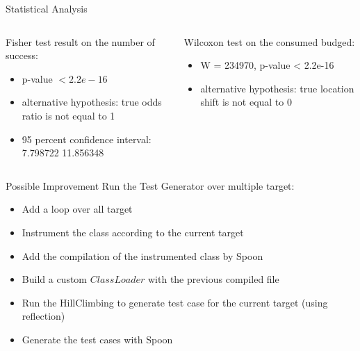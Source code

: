 \documentclass{beamer}
\begin{document}
\begin{frame}{Statistical Analysis}

\begin{columns}
\begin{column}{0.5\textwidth}
Fisher test result on the number of success:
\begin{mdframed}
\begin{itemize}
\item p-value $< 2.2e-16$
\item alternative hypothesis: true odds ratio is not equal to 1
\item 95 percent confidence interval: 7.798722 11.856348
\end{itemize}
\end{mdframed}
\end{column}
\begin{column}{0.5\textwidth}
Wilcoxon test on the consumed budged:
\begin{mdframed}
\begin{itemize}
\item W = 234970, p-value < 2.2e-16
\item alternative hypothesis: true location shift is not equal to 0
\end{itemize}
\end{mdframed}
\end{column}
\end{columns}
\end{frame}


\begin{frame}{Possible Improvement}
Run the Test Generator over multiple target:
\begin{itemize}
\item Add a loop over all target
\item Instrument the class according to the current target
\item Add the compilation of the instrumented class by Spoon
\item Build a custom $ClassLoader$ with the previous compiled file
\item Run the HillClimbing to generate test case for the current target (using reflection)
\item Generate the test cases with Spoon
\end{itemize}
\end{frame}
\end{document}
